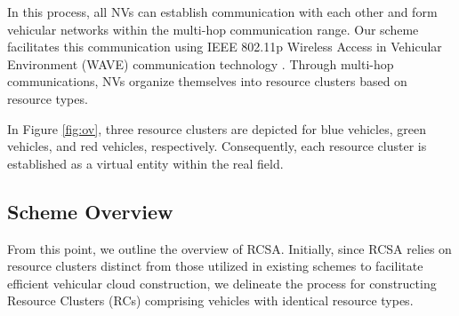 \documentclass[sensors,article,accept,moreauthors,pdftex]{Definitions/mdpi}
\begin{document}
In this process, all NVs can establish communication with each other and form vehicular networks within the multi-hop communication range. Our scheme facilitates this communication using IEEE 802.11p Wireless Access in Vehicular Environment (WAVE) communication technology \cite{wave}. Through multi-hop communications, NVs organize themselves into resource clusters based on resource types.

In Figure \ref{fig:ov}, three resource clusters are depicted for blue vehicles, green vehicles, and red vehicles, respectively. Consequently, each resource cluster is established as a virtual entity within the real field.

\subsection{Scheme Overview}
From this point, we outline the overview of RCSA. Initially, since RCSA relies on resource clusters distinct from those utilized in existing schemes to facilitate efficient vehicular cloud construction, we delineate the process for constructing Resource Clusters (RCs) comprising vehicles with identical resource types.
\end{document}
